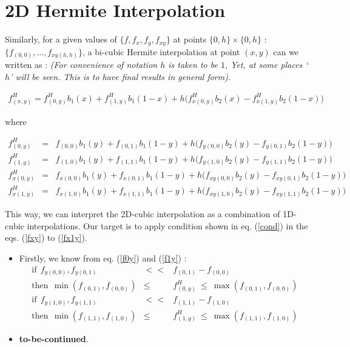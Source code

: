 \documentclass[10pt]{article}
\begin{document}
\section*{2D Hermite Interpolation}

Similarly, for a given values of $\{ f, f_x, f_y, f_{xy} \}$
at points $ \{0, h\} \times \{0, h\}$ : 
$\{ f_{(0, 0)}, ..., f_{xy(h, h)}\}$, 
a bi-cubic Hermite interpolation at point $(x, y)$
can we written as : 
\emph{(For convenience of notation $h$ is taken to be $1$, 
Yet, at some places `$h$' will be seen. This is to have final results in general form)}. 


\begin{eqnarray}
f^H_{(x, y)} = f^H_{(0, y)}b_1(x) + f^H_{(1, y)}b_1(1-x) + h\big( f^H_{x(0, y)}b_2(x) - f^H_{x(1, y)}b_2(1-x) \big) \label{fxy}
\end{eqnarray}

where

\begin{eqnarray}
f^H_{(0, y)} & = & f_{(0, 0)}b_1(y) + f_{(0, 1)}b_1(1-y) + h\big( f_{y(0, 0)}b_2(y) - f_{y(0, 1)}b_2(1-y) \big)  \label{f0y} \\
f^H_{(1, y)} & = & f_{(1, 0)}b_1(y) + f_{(1, 1)}b_1(1-y) + h\big( f_{y(1, 0)}b_2(y) - f_{y(1, 1)}b_2(1-y) \big)  \label{f1y} \\
f^H_{x(0, y)} & = & f_{x(0, 0)}b_1(y) + f_{x(0, 1)}b_1(1-y) + h\big( f_{xy(0, 0)}b_2(y) - f_{xy(0, 1)}b_2(1-y) \big)  \label{fx0y}\\
f^H_{x(1, y)} & = & f_{x(1, 0)}b_1(y) + f_{x(1, 1)}b_1(1-y) + h\big( f_{xy(1, 0)}b_2(y) - f_{xy(1, 1)}b_2(1-y) \big)  \label{fx1y}
\end{eqnarray}


This way, we can interpret the 2D-cubic interpolation as a combination of 1D-cubic interpolations. 
Our target is to apply condition shown in eq. (\ref{cond}) in the eqs. (\ref{fxy}) to (\ref{fx1y}).


\begin{itemize}
\item Firstly, we know from eq. (\ref{f0y}) and (\ref{f1y}) : 
	\begin{eqnarray}
	\text{if} \ \ f_{y(0, 0)}, f_{y(0, 1)} & << & f_{(0,1)} - f_{(0, 0)} \nonumber \\
	\text{then} \ \ \min(f_{(0,1)}, f_{(0,0)}) & \le & f^H_{(0, y)} \ \le \  \max(f_{(0,1)}, f_{(0,0)}) \\
	\text{if} \ \ f_{y(1, 0)}, f_{y(1, 1)} & << & f_{(1,1)} - f_{(1, 0)} \nonumber \\
	\text{then} \ \ \min(f_{(1,1)}, f_{(1,0)}) & \le & f^H_{(1, y)} \ \le \ \max(f_{(1,1)}, f_{(1,0)})
	\end{eqnarray} 
\item \textbf{to-be-continued}. 
\end{itemize}
\end{document}
